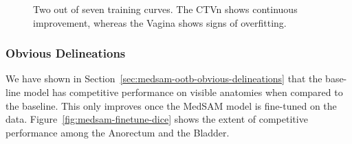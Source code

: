 \documentclass[11pt,twoside]{report}
\begin{document}
\begin{figure}[H]
  \centering
  \caption{Two out of seven training curves. The CTVn shows continuous improvement, whereas the Vagina shows signs of overfitting.}\label{fig:medsam-training-curves}
\end{figure}

\subsubsection{Obvious Delineations}

We have shown in Section~\ref{sec:medsam-ootb-obvious-delineations} that the base-line model has competitive performance on visible anatomies when compared to the baseline. This only improves once the MedSAM model is fine-tuned on the data. Figure~\ref{fig:medsam-finetune-dice} shows the extent of competitive performance among the Anorectum and the Bladder.
\end{document}
